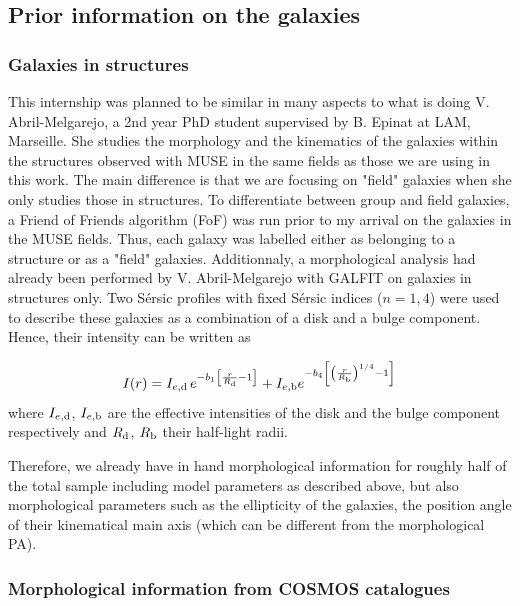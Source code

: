 \subsection{Prior information on the galaxies}

\subsubsection{Galaxies in structures}

This internship was planned to be similar in many aspects to what is doing V. Abril-Melgarejo, a 2nd year PhD student supervised by B. Epinat at LAM, Marseille. She studies the morphology and the kinematics of the galaxies within the structures observed with MUSE in the same fields as those we are using in this work. The main difference is that we are focusing on "field" galaxies when she only studies those in structures. To differentiate between group and field galaxies, a Friend of Friends algorithm (FoF) was run prior to my arrival on the galaxies in the MUSE fields. Thus, each galaxy was labelled either as belonging to a structure or as a "field" galaxies. Additionnaly, a morphological analysis had already been performed by V. Abril-Melgarejo with GALFIT on galaxies in structures only. Two Sérsic profiles with fixed Sérsic indices ($n = 1, 4$) were used to describe these galaxies as a combination of a disk and a bulge component. Hence, their intensity can be written as

\begin{equation}
	I(r) = I_{e, \rm{d}} \, e^{-b_1 \left [ \frac{r}{R_{\rm{d}}} -1 \right ]} + I_{e , \rm{b}} e^{- b_4 \left [ \left ( \frac{r}{R_{\rm{b}}} \right )^{1/4} -1 \right ]}
	\label{eq:GALFIT_light_profile}
\end{equation}
where $I_{e, \rm{d}}$, $I_{e, \rm{b}}$ are the effective intensities of the disk and the bulge component respectively and $R_{\rm{d}}$, $R_{\rm{b}}$ their half-light radii.

Therefore, we already have in hand morphological information for roughly half of the total sample including model parameters as described above, but also morphological parameters such as the ellipticity of the galaxies, the position angle of their kinematical main axis (which can be different from the morphological PA).

\subsubsection{Morphological information from COSMOS catalogues}

